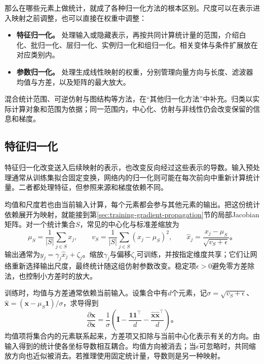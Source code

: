 那么在哪些元素上做统计，就成了各种归一化方法的根本区别。尺度可以在表示进入映射之前调整，也可以直接在权重中调整：
\begin{itemize}
  \item \textbf{特征归一化。} 处理输入或隐藏表示，再按共同计算统计量的范围，介绍白化、批归一化、层归一化、实例归一化和组归一化。相关变体与条件扩展放在对应类别内。
  \item \textbf{参数归一化。} 处理生成线性映射的权重，分别管理向量方向与长度、滤波器均值与方差，以及矩阵的最大放大。
\end{itemize}
混合统计范围、可逆仿射与图结构等方法，在“其他归一化方法”中补充。归类以实际计算对象和范围为依据；同一范围内，中心化、仿射与非线性仍会改变保留的信息和梯度。

\subsection{特征归一化}
\label{sec:training-feature-normalization-methods}
\label{sec:training-normalization-principles}
特征归一化改变送入后续映射的表示，也改变反向经过这些表示的导数。输入预处理通常从训练集拟合固定变换，网络内的归一化则可能在每次前向中重新计算统计量。二者都处理特征，但参照来源和梯度依赖不同。

均值和尺度若也由当前输入计算，每个元素都会参与其他元素的输出。把这份统计依赖展开为映射，就能接到第\ref{sec:training-gradient-propagation}节的局部Jacobian矩阵。对一个统计集合$S$，常见的中心化与标准差缩放为
\begin{equation}
  \mu_S=\frac1{|S|}\sum_{j\in S}x_j,\qquad
  v_S=\frac1{|S|}\sum_{j\in S}(x_j-\mu_S)^2,\qquad
  \hat x_j=\frac{x_j-\mu_S}{\sqrt{v_S+\epsilon}}\text{。}
  \label{eq:training-normalization-common}
\end{equation}
输出通常为$y_j=\gamma_j\hat x_j+\zeta_j$。缩放$\gamma_j$与偏移$\zeta_j$可训练，并按指定维度共享；它们让网络重新选择输出尺度，最终统计随这组仿射参数改变。稳定项$\epsilon>0$避免零方差除法，也控制小方差时的放大。

训练时，均值与方差通常依赖当前输入。设集合中有$d$个元素，记$\sigma=\sqrt{v_S+\epsilon}$、$\hat{\bm x}=(\bm x-\mu_S\bm1)/\sigma$，求导得到
\begin{equation}
  \frac{\partial\hat{\bm x}}{\partial\bm x}
  =\frac1\sigma\left(\bm I-\frac{\bm1\bm1^{\top}}d
                          -\frac{\hat{\bm x}\hat{\bm x}^{\top}}d\right)\text{。}
  \label{eq:training-normalization-jacobian}
\end{equation}
均值项将集合内的元素联系起来，方差项又扣除与当前中心化表示有关的方向。由输入得到的统计使各坐标导数相互耦合。均值方向被消去；当$\epsilon$可忽略时，共同缩放方向也近似被消去。若推理使用固定统计量，导数则是另一种映射。

